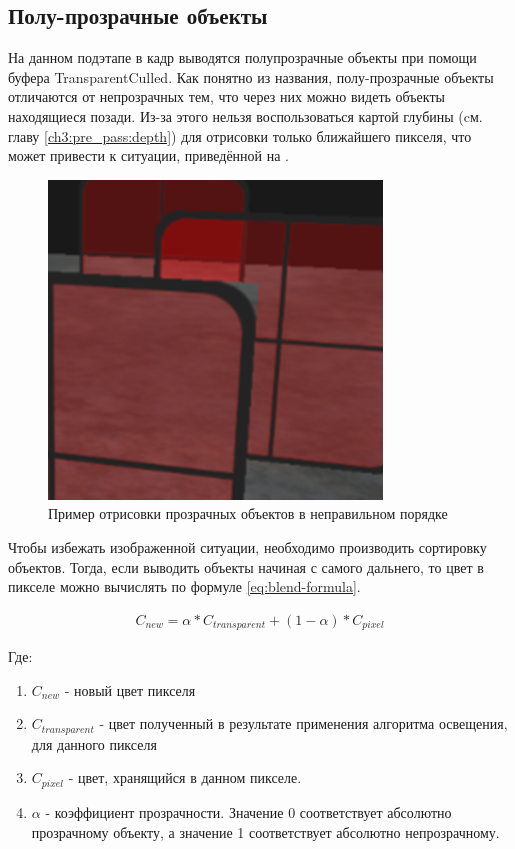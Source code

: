 	\subsection{Полу-прозрачные объекты} \label{ch3:render_pass:transparents}
		На данном подэтапе в кадр выводятся полупрозрачные объекты при помощи буфера TransparentCulled. Как понятно из названия, полу-прозрачные объекты отличаются от непрозрачных тем, что через них можно видеть объекты находящиеся позади. Из-за этого нельзя воспользоваться картой глубины (cм. главу \ref{ch3:pre_pass:depth}) для отрисовки только ближайшего пикселя, что может привести к ситуации, приведённой на .
		
		\begin{figure}[ht!] 
			\center
			\includegraphics [scale=0.5] {my_folder/images//incorrect_transparent}	
			\caption{Пример отрисовки прозрачных объектов в неправильном порядке} 
			\label{fig:incorrect_transparent}
		\end{figure}
		\FloatBarrier
		
		Чтобы избежать изображенной ситуации, необходимо производить сортировку объектов. Тогда, если выводить объекты начиная с самого дальнего, то цвет в пикселе можно вычислять по формуле \ref{eq:blend-formula}.
		
		\begin{equation}
			\label{eq:blend-formula}
			\begin{multlined}
				C_{new} = \alpha * C_{transparent} + (1 - \alpha) * C_{pixel}
			\end{multlined}
		\end{equation}
		
		Где:
		\begin{enumerate}[1.]
			\item $C_{new}$ - новый цвет пикселя
			\item $C_{transparent}$ - цвет полученный в результате применения алгоритма освещения, для данного пикселя
			\item $C_{pixel}$ - цвет, хранящийся в данном пикселе.
			\item $\alpha$ - коэффициент прозрачности. Значение 0 соответствует абсолютно прозрачному объекту, а значение 1 соответствует абсолютно непрозрачному.
		\end{enumerate}
		
